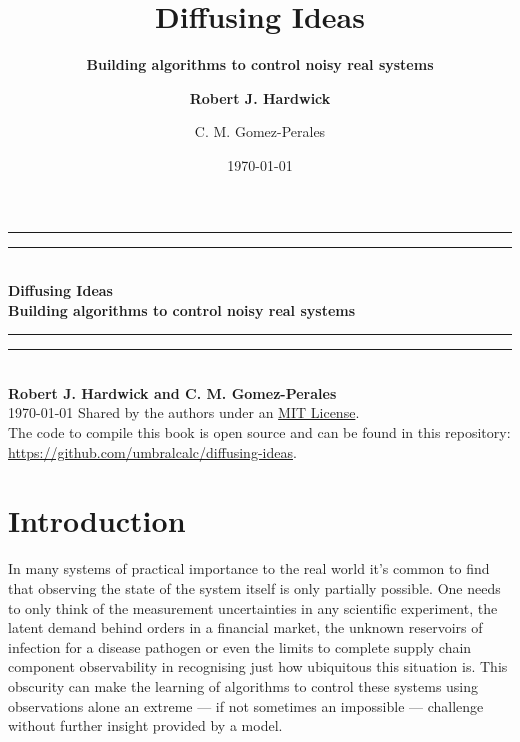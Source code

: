 \documentclass{book}
\title{\Huge \bfseries\sffamily Diffusing Ideas}
\subtitle{\Large \bfseries\sffamily \color{gray75} Building algorithms to control noisy real systems}
\author{\bfseries\sffamily Robert J. Hardwick  \and C. M. Gomez-Perales}
\date{\today}
\begin{document}
\begin{titlepage}
\centering
\vspace*{1.5\baselineskip}
{\color{gray75}\rule{13cm}{1.3pt}}\vspace*{-\baselineskip}\vspace*{2pt} %
{\color{gray75}\rule{13cm}{0.4pt}} \\ %
\vspace{1.2\baselineskip} %
{\Huge \bfseries\sffamily Diffusing Ideas} \\ 
\vspace{4mm}
{\Large \bfseries\sffamily \color{gray75} Building algorithms to control noisy real systems \\}
\vspace*{0.75\baselineskip}
{\color{gray75}\rule{13cm}{0.4pt}}\vspace*{-\baselineskip}\vspace*{2.75pt} %
{\color{gray75}\rule{13cm}{1.3pt}} \\ %
\vspace{1.0\baselineskip} %
{\large \bfseries\sffamily Robert J. Hardwick and C. M. Gomez-Perales \\
\vspace*{1.2\baselineskip}}
\today
\vfill
Shared by the authors under an \href{https://opensource.org/licenses/MIT}{MIT License}.\\ \vspace{1mm}
The code to compile this book is open source and can be found in this repository: \url{https://github.com/umbralcalc/diffusing-ideas}.
\end{titlepage}

\chapter*{Introduction}

In many systems of practical importance to the real world it's common to find that observing the state of the system itself is only partially possible. One needs to only think of the measurement uncertainties in any scientific experiment, the latent demand behind orders in a financial market, the unknown reservoirs of infection for a disease pathogen or even the limits to complete supply chain component observability in recognising just how ubiquitous this situation is. This obscurity can make the learning of algorithms to control these systems using observations alone an extreme --- if not sometimes an impossible --- challenge without further insight provided by a model.
\end{document}
